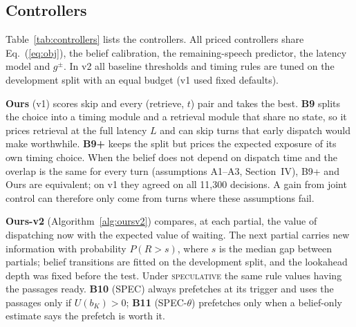 \subsection{Controllers}
\label{subsec:decision_rule}

Table~\ref{tab:controllers} lists the controllers. All priced controllers
share Eq.~(\ref{eq:obj}), the belief calibration, the remaining-speech
predictor, the latency model and $g^{\pm}$. In v2 all baseline thresholds
and timing rules are tuned on the development split with an equal budget
(v1 used fixed defaults).

\textbf{Ours} (v1) scores skip and every (retrieve, $t$) pair and takes the
best. \textbf{B9} splits the choice into a timing module and a retrieval
module that share no state, so it prices retrieval at the full latency $L$
and can skip turns that early dispatch would make worthwhile. \textbf{B9+}
keeps the split but prices the expected exposure of its own timing choice.
When the belief does not depend on dispatch time and the overlap is the same
for every turn (assumptions A1--A3, Section~IV), B9+ and Ours are
equivalent; on v1 they agreed on all 11{,}300 decisions. A gain from joint
control can therefore only come from turns where these assumptions fail.

\textbf{Ours-v2} (Algorithm~\ref{alg:oursv2}) compares, at each partial, the
value of dispatching now with the expected value of waiting. The next
partial carries new information with probability $P(R>s)$, where $s$ is the
median gap between partials; belief transitions are fitted on the
development split, and the lookahead depth was fixed before the test. Under
\textsc{speculative} the same rule values having the passages ready.
\textbf{B10} (SPEC) always prefetches at its trigger and uses the passages
only if $U(b_K)>0$; \textbf{B11} (SPEC-$\theta$) prefetches only when a
belief-only estimate says the prefetch is worth it.

